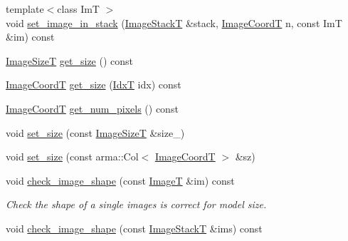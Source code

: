 \begin{DoxyCompactItemize}
\item 
{\footnotesize template$<$class ImT $>$ }\\void \hyperlink{classmappel_1_1ImageFormat1DBase_a90fcfb6e39374e4372ec1cedf3c2cb91}{set\+\_\+image\+\_\+in\+\_\+stack} (\hyperlink{classmappel_1_1ImageFormat1DBase_a81e3246d1c5c37ebf9077b7b5bd25a76}{Image\+StackT} \&stack, \hyperlink{classmappel_1_1ImageFormat1DBase_a82ab3168eb1a87eaeb3e7c919188e9fc}{Image\+CoordT} n, const ImT \&im) const 
\item 
\hyperlink{classmappel_1_1ImageFormat1DBase_a6456bab2b26702022ee32ae19e90dcac}{Image\+SizeT} \hyperlink{classmappel_1_1ImageFormat1DBase_aea1194302eccc0d8ad62394176aa6b0c}{get\+\_\+size} () const 
\item 
\hyperlink{classmappel_1_1ImageFormat1DBase_a82ab3168eb1a87eaeb3e7c919188e9fc}{Image\+CoordT} \hyperlink{classmappel_1_1ImageFormat1DBase_a995bdd3b1be616d8d87af3a4a51fbad8}{get\+\_\+size} (\hyperlink{namespacemappel_ab17ec0f30b61ece292439d7ece81d3a8}{IdxT} idx) const 
\item 
\hyperlink{classmappel_1_1ImageFormat1DBase_a82ab3168eb1a87eaeb3e7c919188e9fc}{Image\+CoordT} \hyperlink{classmappel_1_1ImageFormat1DBase_a96644883bef9d230eea893ece4578e96}{get\+\_\+num\+\_\+pixels} () const 
\item 
void \hyperlink{classmappel_1_1ImageFormat1DBase_ad169407f15bd43b0cec18fa2c88725b7}{set\+\_\+size} (const \hyperlink{classmappel_1_1ImageFormat1DBase_a6456bab2b26702022ee32ae19e90dcac}{Image\+SizeT} \&size\+\_\+)
\item 
void \hyperlink{classmappel_1_1ImageFormat1DBase_ae35eebe826c2ffdb6e0b599806c88667}{set\+\_\+size} (const arma\+::\+Col$<$ \hyperlink{classmappel_1_1ImageFormat1DBase_a82ab3168eb1a87eaeb3e7c919188e9fc}{Image\+CoordT} $>$ \&sz)
\item 
void \hyperlink{classmappel_1_1ImageFormat1DBase_af308ca86f413f65e72ea7b8c890bd87a}{check\+\_\+image\+\_\+shape} (const \hyperlink{classmappel_1_1ImageFormat1DBase_a521a1ff391a52a636fac4aac7c7ba02c}{ImageT} \&im) const 
\begin{DoxyCompactList}\small\item\em Check the shape of a single images is correct for model size. \end{DoxyCompactList}\item 
void \hyperlink{classmappel_1_1ImageFormat1DBase_a8d5c0744643bf0bbbf30dd3122f98190}{check\+\_\+image\+\_\+shape} (const \hyperlink{classmappel_1_1ImageFormat1DBase_a81e3246d1c5c37ebf9077b7b5bd25a76}{Image\+StackT} \&ims) const 

\end{DoxyCompactItemize}
